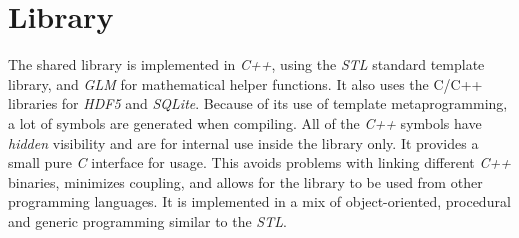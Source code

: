 \documentclass[a4paper,10pt,abstracton,notitlepage]{scrreprt}
\begin{document}
\section{Library}
The shared library is implemented in \emph{C++}, using the \emph{STL} standard template library, and \emph{GLM} for mathematical helper functions. It also uses the C/C++ libraries for \emph{HDF5} and \emph{SQLite}. Because of its use of template metaprogramming, a lot of symbols are generated when compiling. All of the \emph{C++} symbols have \emph{hidden} visibility and are for internal use inside the library only. It provides a small pure \emph{C} interface for usage. This avoids problems with linking different \emph{C++} binaries, minimizes coupling, and allows for the library to be used from other programming languages. It is implemented in a mix of object-oriented, procedural and generic programming similar to the \emph{STL}.
\end{document}
